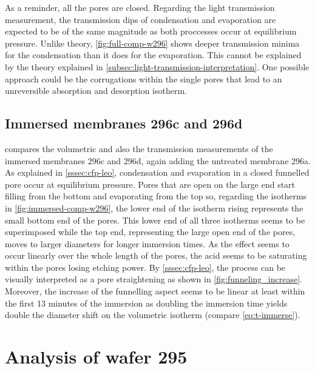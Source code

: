 \documentclass[thesis.tex]{subfiles}
\begin{document}
          As a reminder, all the pores are closed. Regarding the light transmission measurement, the transmission dips of condensation and evaporation are expected to be of the same magnitude as both proccesses occur at equilibrium pressure. Unlike theory, \cref{fig:full-comp-w296} shows deeper transmission minima for the condensation than it does for the evaporation. This cannot be explained by the theory explained in \cref{subsec:light-transmission-interpretation}. One possible approach could be the corrugations within the single pores that lead to an unreversible absorption and desorption isotherm.

          


      \subsection{Immersed membranes 296c and 296d}
      \label{subsec:immersed-membranes}

          

           compares the volumetric and also the transmission measurements of the immersed membranes 296c and 296d, again adding the untreated membrane 296a. As explained in \cref{sssec:cfp-leo}, condensation and evaporation in a closed funnelled pore occur at equilibrium pressure. Pores that are open on the large end start filling from the bottom and evaporating from the top so, regarding the isotherms in \cref{fig:immersed-comp-w296}, the lower end of the isotherm rising represents the small bottom end of the pores. This lower end of all three isotherms seems to be superimposed while the top end, representing the large open end of the pores, moves to larger diameters for longer immersion times. As the effect seems to occur linearly over the whole length of the pores, the acid seems to be saturating within the pores losing etching power. By \cref{sssec:cfp-leo}, the process can be visually interpreted as a pore straightening as shown in \cref{fig:funneling_increase}. Moreover, the increase of the funnelling aspect seems to be linear at least within the first 13 minutes of the immersion as doubling the immersion time yields double the diameter shift on the volumetric isotherm (compare \cref{eq:t-immerse}).

          


    \section{Analysis of wafer 295}
    \label{sec:wafer295}
\end{document}
